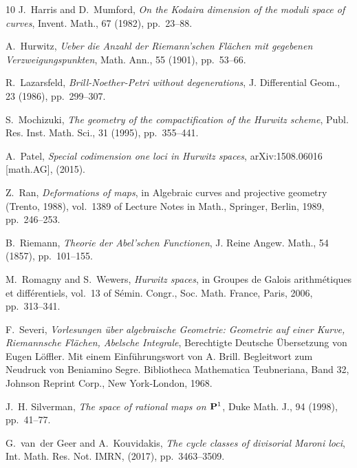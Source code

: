 \documentclass{amsart}
\numberwithin{equation}{section}
\begin{document}
\begin{thebibliography}{10}
{\sc J.~Harris and D.~Mumford}, {\em On the {K}odaira dimension of the moduli
  space of curves}, Invent. Math., 67 (1982), pp.~23--88.

{\sc A.~Hurwitz}, {\em Ueber die {A}nzahl der {R}iemann'schen {F}l\"achen mit
  gegebenen {V}erzweigungspunkten}, Math. Ann., 55 (1901), pp.~53--66.

{\sc R.~Lazarsfeld}, {\em Brill-{N}oether-{P}etri without degenerations}, J.
  Differential Geom., 23 (1986), pp.~299--307.

{\sc S.~Mochizuki}, {\em The geometry of the compactification of the {H}urwitz
  scheme}, Publ. Res. Inst. Math. Sci., 31 (1995), pp.~355--441.

{\sc A.~{Patel}}, {\em {Special codimension one loci in Hurwitz spaces}},
  arXiv:1508.06016 [math.AG],  (2015).

{\sc Z.~Ran}, {\em Deformations of maps}, in Algebraic curves and projective
  geometry ({T}rento, 1988), vol.~1389 of Lecture Notes in Math., Springer,
  Berlin, 1989, pp.~246--253.

{\sc B.~{Riemann}}, {\em {Theorie der Abel'schen Functionen}}, J. Reine Angew.
  Math., 54 (1857), pp.~101--155.

{\sc M.~Romagny and S.~Wewers}, {\em Hurwitz spaces}, in Groupes de {G}alois
  arithm\'etiques et diff\'erentiels, vol.~13 of S\'emin. Congr., Soc. Math.
  France, Paris, 2006, pp.~313--341.

{\sc F.~Severi}, {\em Vorlesungen \"uber algebraische {G}eometrie: {G}eometrie
  auf einer {K}urve, {R}iemannsche {F}l\"achen, {A}belsche {I}ntegrale},
  Berechtigte Deutsche \"Ubersetzung von Eugen L\"offler. Mit einem
  Einf\"uhrungswort von A. Brill. Begleitwort zum Neudruck von Beniamino Segre.
  Bibliotheca Mathematica Teubneriana, Band 32, Johnson Reprint Corp., New
  York-London, 1968.

{\sc J.~H. Silverman}, {\em The space of rational maps on {$\bold P^1$}}, Duke
  Math. J., 94 (1998), pp.~41--77.

{\sc G.~van~der Geer and A.~Kouvidakis}, {\em The cycle classes of divisorial
  {M}aroni loci}, Int. Math. Res. Not. IMRN,  (2017), pp.~3463--3509.

\end{thebibliography}
 

\end{document}
